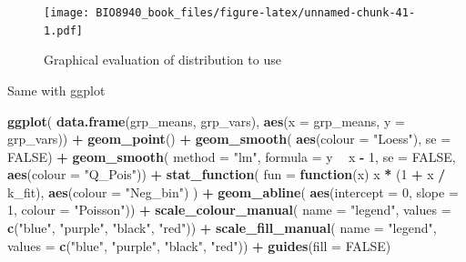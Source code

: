 \documentclass[
  12pt,
]{book}
\newenvironment{Shaded}{\begin{snugshade}}{\end{snugshade}}
\newcommand{\ControlFlowTok}[1]{\textcolor[rgb]{0.13,0.29,0.53}{\textbf{#1}}}
\newcommand{\DataTypeTok}[1]{\textcolor[rgb]{0.13,0.29,0.53}{#1}}
\newcommand{\DecValTok}[1]{\textcolor[rgb]{0.00,0.00,0.81}{#1}}
\newcommand{\KeywordTok}[1]{\textcolor[rgb]{0.13,0.29,0.53}{\textbf{#1}}}
\newcommand{\NormalTok}[1]{#1}
\newcommand{\OperatorTok}[1]{\textcolor[rgb]{0.81,0.36,0.00}{\textbf{#1}}}
\newcommand{\OtherTok}[1]{\textcolor[rgb]{0.56,0.35,0.01}{#1}}
\newcommand{\StringTok}[1]{\textcolor[rgb]{0.31,0.60,0.02}{#1}}
\begin{document}
\begin{figure}
\centering
\texttt{[image: BIO8940\_book\_files/figure-latex/unnamed-chunk-41-1.pdf]}
\caption{\label{fig:unnamed-chunk-41}Graphical evaluation of distribution to use}
\end{figure}

Same with ggplot

\begin{Shaded}
\begin{Highlighting}[]
\KeywordTok{ggplot}\NormalTok{(}
  \KeywordTok{data.frame}\NormalTok{(grp_means, grp_vars),}
  \KeywordTok{aes}\NormalTok{(}\DataTypeTok{x =}\NormalTok{ grp_means, }\DataTypeTok{y =}\NormalTok{ grp_vars)) }\OperatorTok{+}
\StringTok{  }\KeywordTok{geom_point}\NormalTok{() }\OperatorTok{+}
\StringTok{  }\KeywordTok{geom_smooth}\NormalTok{(}
    \KeywordTok{aes}\NormalTok{(}\DataTypeTok{colour =} \StringTok{"Loess"}\NormalTok{), }\DataTypeTok{se =} \OtherTok{FALSE}\NormalTok{) }\OperatorTok{+}
\StringTok{  }\KeywordTok{geom_smooth}\NormalTok{(}
    \DataTypeTok{method =} \StringTok{"lm"}\NormalTok{, }\DataTypeTok{formula =}\NormalTok{ y }\OperatorTok{~}\StringTok{ }\NormalTok{x }\OperatorTok{-}\StringTok{ }\DecValTok{1}\NormalTok{, }\DataTypeTok{se =} \OtherTok{FALSE}\NormalTok{,}
    \KeywordTok{aes}\NormalTok{(}\DataTypeTok{colour =} \StringTok{"Q_Pois"}\NormalTok{)) }\OperatorTok{+}
\StringTok{  }\KeywordTok{stat_function}\NormalTok{(}
    \DataTypeTok{fun =} \ControlFlowTok{function}\NormalTok{(x) x }\OperatorTok{*}\StringTok{ }\NormalTok{(}\DecValTok{1} \OperatorTok{+}\StringTok{ }\NormalTok{x }\OperatorTok{/}\StringTok{ }\NormalTok{k_fit),}
    \KeywordTok{aes}\NormalTok{(}\DataTypeTok{colour =} \StringTok{"Neg_bin"}\NormalTok{)}
\NormalTok{  ) }\OperatorTok{+}
\StringTok{  }\KeywordTok{geom_abline}\NormalTok{(}
    \KeywordTok{aes}\NormalTok{(}\DataTypeTok{intercept =} \DecValTok{0}\NormalTok{, }\DataTypeTok{slope =} \DecValTok{1}\NormalTok{, }\DataTypeTok{colour =} \StringTok{"Poisson"}\NormalTok{)) }\OperatorTok{+}
\StringTok{  }\KeywordTok{scale_colour_manual}\NormalTok{(}
    \DataTypeTok{name =} \StringTok{"legend"}\NormalTok{,}
    \DataTypeTok{values =} \KeywordTok{c}\NormalTok{(}\StringTok{"blue"}\NormalTok{, }\StringTok{"purple"}\NormalTok{, }\StringTok{"black"}\NormalTok{, }\StringTok{"red"}\NormalTok{)) }\OperatorTok{+}
\StringTok{  }\KeywordTok{scale_fill_manual}\NormalTok{(}
    \DataTypeTok{name =} \StringTok{"legend"}\NormalTok{,}
    \DataTypeTok{values =} \KeywordTok{c}\NormalTok{(}\StringTok{"blue"}\NormalTok{, }\StringTok{"purple"}\NormalTok{, }\StringTok{"black"}\NormalTok{, }\StringTok{"red"}\NormalTok{)) }\OperatorTok{+}
\StringTok{  }\KeywordTok{guides}\NormalTok{(}\DataTypeTok{fill =} \OtherTok{FALSE}\NormalTok{)}
\end{Highlighting}
\end{Shaded}
\end{document}
